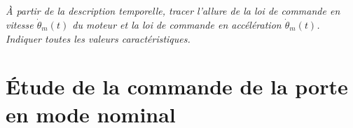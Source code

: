\documentclass[10pt]{article}
\begin{document}
\subparagraph{}
\textit{
\`A partir de la description temporelle, tracer l’allure de la loi de commande en vitesse $\dot{\theta}_m(t)$ du moteur et la loi de commande en accélération $\dot{\theta}_m(t)$. Indiquer toutes les valeurs caractéristiques.
}



\section{Étude de la commande de la porte en mode nominal}
\end{document}
